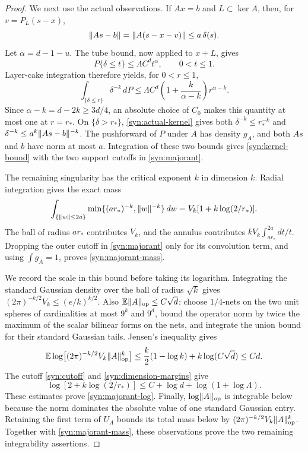 \begin{proof}
We next use the actual observations.  If \(Ax=b\) and \(L\subset\ker A\),
then, for \(v=P_L(s-x)\),
\begin{equation}\label{syn:actual-kernel}
 \lVert As-b\rVert=\lVert A(s-x-v)\rVert\le a\,\delta(s).
\end{equation}
Let \(\alpha=d-1-u\).  The tube bound, now applied to \(x+L\), gives
\[
 P\{\delta\le t\}\le\Lambda C^d t^\alpha,\qquad 0<t\le1.
\]
Layer-cake integration therefore yields, for \(0<r\le1\),
\[
 \int_{\{\delta\le r\}}\delta^{-k}\,dP
 \le \Lambda C^d
       \left(1+\frac{k}{\alpha-k}\right)r^{\alpha-k}.
\]
Since \(\alpha-k=d-2k\ge3d/4\), an absolute choice of \(C_0\) makes this
quantity at most one at \(r=r_*\).  On \(\{\delta>r_*\}\),
\eqref{syn:actual-kernel} gives both
\(\delta^{-k}\le r_*^{-k}\) and
\(\delta^{-k}\le a^k\lVert As-b\rVert^{-k}\).
The pushforward of \(P\) under \(A\) has density \(g_A\), and both \(As\)
and \(b\) have norm at most \(a\).  Integration of these two bounds gives
\eqref{syn:kernel-bound} with the two support cutoffs in
\eqref{syn:majorant}.

The remaining singularity has the critical exponent \(k\) in dimension
\(k\).  Radial integration gives the exact mass
\begin{equation}\label{syn:critical-mass}
 \int_{\{\lVert w\rVert\le2a\}}
       \min\{(ar_*)^{-k},\lVert w\rVert^{-k}\}\,dw
 =V_k[1+k\log(2/r_*)].
\end{equation}
The ball of radius \(ar_*\) contributes \(V_k\), and the annulus contributes
\(kV_k\int_{ar_*}^{2a}dt/t\).  Dropping the outer cutoff in
\eqref{syn:majorant} only for its convolution term, and using
\(\int g_A=1\), proves \eqref{syn:majorant-mass}.

We record the scale in this bound before taking its logarithm.  Integrating
the standard Gaussian density over the ball of radius \(\sqrt k\) gives
\((2\pi)^{-k/2}V_k\le(e/k)^{k/2}\).  Also
\(\mathbb E\lVert A\rVert_{\mathrm{op}}\le C\sqrt d\): choose \(1/4\)-nets on the two unit
spheres of cardinalities at most \(9^k\) and \(9^d\), bound the operator
norm by twice the maximum of the scalar bilinear forms on the nets, and
integrate the union bound for their standard Gaussian tails.  Jensen's
inequality gives
\[
 \mathbb E\log\bigl[(2\pi)^{-k/2}V_k\lVert A\rVert_{\mathrm{op}}^k\bigr]
 \le\frac k2(1-\log k)+k\log(C\sqrt d)\le Cd.
\]
The cutoff \eqref{syn:cutoff} and \eqref{syn:dimension-margins} give
\[
 \log[2+k\log(2/r_*)]
 \le C+\log d+\log(1+\log\Lambda).
\]
These estimates prove \eqref{syn:majorant-log}.  Finally,
\(\log\lVert A\rVert_{\mathrm{op}}\) is integrable below because the norm dominates the
absolute value of one standard Gaussian entry.  Retaining the first term
of \(U_A\) bounds its total mass below by
\((2\pi)^{-k/2}V_k\lVert A\rVert_{\mathrm{op}}^k\).
Together with \eqref{syn:majorant-mass}, these observations prove the two
remaining integrability assertions.
\end{proof}

